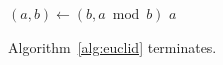 \documentclass{article}
\begin{document}
\begin{algorithm}
\caption{Euclid's algorithm}\label{alg:euclid}
\begin{algorithmic}[1]
    \State $(a, b) \gets (b, a \bmod b)$
  \EndWhile
  \State \Return $a$
\EndProcedure
\end{algorithmic}
\end{algorithm}
Algorithm~\ref{alg:euclid} terminates.
\end{document}
